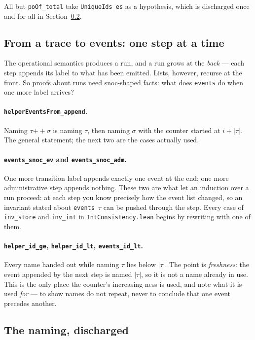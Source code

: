 \documentclass[11pt]{article}
\newcommand{\lean}[1]{\texttt{\small #1}}
\begin{document}
All but \lean{poOf\_total} take \lean{UniqueIds es} as a hypothesis, which is
discharged once and for all in Section~\ref{sec:naming}.

\subsection{From a trace to events: one step at a time}

The operational semantics produces a run, and a run grows at the \emph{back} ---
each step appends its label to what has been emitted. Lists, however, recurse at
the front. So proofs about runs need snoc-shaped facts: what does \lean{events}
do when one more label arrives?

\paragraph{\lean{helperEventsFrom\_append}.}
Naming $\tau \mathbin{+\!\!+} \sigma$ is naming $\tau$, then naming $\sigma$ with
the counter started at $i + |\tau|$. The general statement; the next two are the
cases actually used.

\paragraph{\lean{events\_snoc\_ev} and \lean{events\_snoc\_adm}.}
One more transition label appends exactly one event at the end;
one more administrative step appends nothing. These two are what let an induction
over a run proceed: at each step you know precisely how the event list changed,
so an invariant stated about \lean{events $\tau$} can be pushed through the step.
Every case of \lean{inv\_store} and \lean{inv\_int} in
\texttt{IntConsistency.lean} begins by rewriting with one of them.

\paragraph{\lean{helper\_id\_ge}, \lean{helper\_id\_lt}, \lean{events\_id\_lt}.}
Every name handed out while naming $\tau$ lies below $|\tau|$. The point is
\emph{freshness}: the event appended by the next step is named $|\tau|$, so it is
not a name already in use. This is the only place the counter's increasing-ness
is used, and note what it is used \emph{for} --- to show names do not repeat,
never to conclude that one event precedes another.

\subsection{The naming, discharged}
\label{sec:naming}
\end{document}
